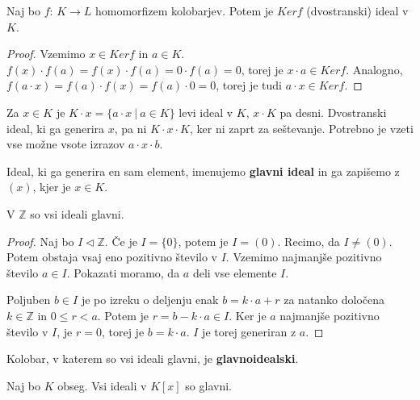 \documentclass[11pt, a4paper]{article}
\begin{document}
    \begin{proposition}
        Naj bo \(f\): \(K \to L\) homomorfizem kolobarjev. Potem je \(Ker f\) (dvostranski) ideal v \(K\).
    \end{proposition}

    \begin{proof}
        Vzemimo \(x \in Ker f\) in \(a \in K\). \(f(x) \cdot f(a) = f(x) \cdot f(a) = 0 \cdot f(a) = 0\), torej je \(x \cdot a \in Ker f\). Analogno, \(f(a \cdot x) = f(a) \cdot f(x) = f(a) \cdot 0 = 0\), torej je tudi \(a \cdot x \in Ker f\).
    \end{proof}

    Za \(x \in K\) je \(K \cdot x = \{a \cdot x\ |\ a \in K\}\) levi ideal v \(K\), \(x \cdot K\) pa desni. Dvostranski ideal, ki ga generira \(x\), pa ni \(K \cdot x \cdot K\), ker ni zaprt za seštevanje. Potrebno je vzeti vse možne vsote izrazov \(a \cdot x \cdot b\).

    \begin{definition}
        Ideal, ki ga generira en sam element, imenujemo \textbf{glavni ideal} in ga zapišemo z \((x)\), kjer je \(x \in K\).
    \end{definition}

    \begin{proposition}
        V \(\mathbb{Z}\) so vsi ideali glavni.
    \end{proposition}

    \begin{proof}
        Naj bo \(I \triangleleft \mathbb{Z}\). Če je \(I = \{0\}\), potem je \(I = (0)\). Recimo, da \(I \neq (0)\). Potem obstaja vsaj eno pozitivno število v \(I\). Vzemimo najmanjše pozitivno število \(a \in I\). Pokazati moramo, da \(a\) deli vse elemente \(I\).
        \par
        Poljuben \(b \in I\) je po izreku o deljenju enak \(b = k \cdot a + r\) za natanko določena \(k \in \mathbb{Z}\) in \(0 \le r < a\). Potem je \(r = b - k \cdot a \in I\). Ker je \(a\) najmanjše pozitivno število v \(I\), je \(r = 0\), torej je \(b = k \cdot a\). \(I\) je torej generiran z \(a\).
    \end{proof}

    \begin{definition}
        Kolobar, v katerem so vsi ideali glavni, je \textbf{glavnoidealski}.
    \end{definition}


    \begin{proposition}
        Naj bo \(K\) obseg. Vsi ideali v \(K[x]\) so glavni.
    \end{proposition}
\end{document}
